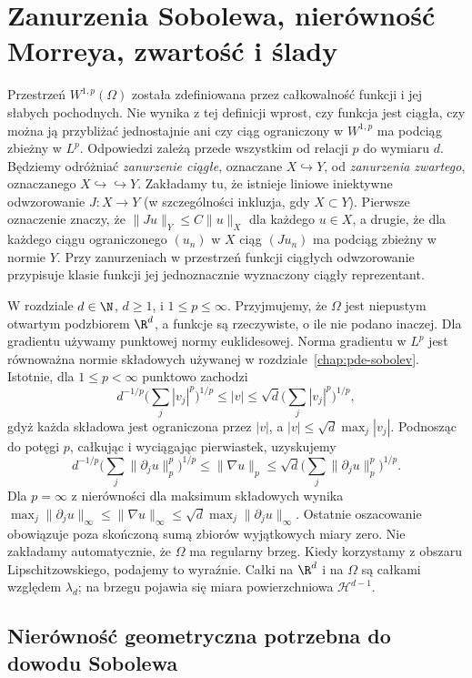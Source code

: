\chapter[Zanurzenia i zwartość Sobolewa]{Zanurzenia Sobolewa, nierówność Morreya, zwartość i ślady}
\label{chap:pde-embeddings}

Przestrzeń $W^{1,p}(\Omega)$ została zdefiniowana przez całkowalność
funkcji i jej słabych pochodnych. Nie wynika z tej definicji wprost,
czy funkcja jest ciągła, czy można ją przybliżać jednostajnie
ani czy ciąg ograniczony w $W^{1,p}$ ma podciąg zbieżny w $L^p$.
Odpowiedzi zależą przede wszystkim od relacji $p$ do wymiaru $d$.
Będziemy odróżniać \emph{zanurzenie ciągłe}, oznaczane
$X\hookrightarrow Y$, od \emph{zanurzenia zwartego}, oznaczanego
$X\hookrightarrow\hookrightarrow Y$. Zakładamy tu, że
istnieje liniowe iniektywne odwzorowanie $J:X\to Y$
(w szczególności inkluzja, gdy $X\subset Y$).
Pierwsze oznaczenie znaczy, że $\|Ju\|_Y\le C\|u\|_X$
dla każdego $u\in X$, a drugie, że dla każdego ciągu
ograniczonego $(u_n)$ w $X$ ciąg $(Ju_n)$ ma podciąg
zbieżny w normie $Y$. Przy zanurzeniach w przestrzeń
funkcji ciągłych odwzorowanie przypisuje klasie funkcji
jej jednoznacznie wyznaczony ciągły reprezentant.

W rozdziale $d\in\N$, $d\ge1$, i $1\le p\le\infty$.
Przyjmujemy, że $\Omega$ jest niepustym otwartym podzbiorem
$\R^d$, a funkcje są rzeczywiste, o ile nie podano inaczej.
Dla gradientu używamy punktowej normy euklidesowej.
Norma gradientu w $L^p$ jest równoważna normie składowych
używanej w rozdziale~\ref{chap:pde-sobolev}. Istotnie,
dla $1\le p<\infty$ punktowo zachodzi
\[
 d^{-1/p}\Big(\sum_j |v_j|^p\Big)^{1/p}
 \le |v|\le \sqrt d\Big(\sum_j|v_j|^p\Big)^{1/p},
\]
gdyż każda składowa jest ograniczona przez $|v|$,
a $|v|\le\sqrt d\max_j|v_j|$. Podnosząc do potęgi $p$,
całkując i wyciągając pierwiastek, uzyskujemy
\[
 d^{-1/p}\Big(\sum_j\|\partial_j u\|_p^p\Big)^{1/p}
 \le\|\nabla u\|_p
 \le\sqrt d\Big(\sum_j\|\partial_j u\|_p^p\Big)^{1/p}.
\]
Dla $p=\infty$ z nierówności dla maksimum składowych
wynika
$\max_j\|\partial_j u\|_\infty\le\|\nabla u\|_\infty
\le\sqrt d\max_j\|\partial_j u\|_\infty$.
Ostatnie oszacowanie obowiązuje poza skończoną sumą
zbiorów wyjątkowych miary zero.
Nie zakładamy automatycznie,
że $\Omega$ ma regularny brzeg. Kiedy korzystamy z obszaru Lipschitzowskiego, podajemy to wyraźnie. Całki na $\R^d$ i na
$\Omega$ są całkami względem $\lambda_d$; na brzegu pojawia się
miara powierzchniowa $\mathcal H^{d-1}$.

\section{Nierówność geometryczna potrzebna do dowodu Sobolewa}
\label{sec:pde10-LW}

